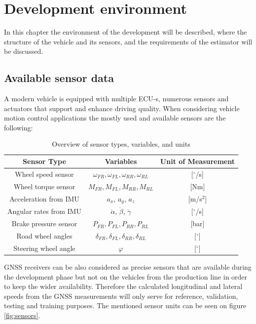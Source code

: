 \chapter{Development environment}

In this chapter the environment of the development will be described, where the structure of the vehicle and its sensors, and the requirements of the estimator will be discussed.

\section{Available sensor data}

A modern vehicle is equipped with multiple ECU-s, numerous sensors and actuators that support and enhance driving quality. When considering vehicle motion control applications the mostly used and available sensors are the following:
\begin{table}[ht]
\centering
\begin{tabular}{|c|c|c|}
\hline
\textbf{Sensor Type} & \textbf{Variables} & \textbf{Unit of Measurement} \\
\hline
Wheel speed sensor & $\omega_{FR}, \omega_{FL}, \omega_{RR}, \omega_{RL}$ & [$^\circ$/s] \\
\hline
Wheel torque sensor & $M_{FR}, M_{FL}, M_{RR}, M_{RL}$ & [Nm] \\
\hline
Acceleration from IMU & $a_x$, $a_y$, $a_z$ & [m/s$^2$] \\
\hline
Angular rates from IMU & $\dot{\alpha}$, $\dot{\beta}$, $\dot{\gamma}$ & [$^\circ$/s] \\
\hline
Brake pressure sensor & $P_{FR}, P_{FL}, P_{RR}, P_{RL}$ & [bar] \\
\hline
Road wheel angles & $\delta_{FR}, \delta_{FL}, \delta_{RR}, \delta_{RL}$ & [$^\circ$] \\
\hline
Steering wheel angle & $\varphi$ & [$^\circ$] \\
\hline
\end{tabular}
\caption{Overview of sensor types, variables, and units}
\label{tab:sensor_table}
\end{table}


GNSS receivers can be also considered as precise sensors that are available during the development phase but not on the vehicles from the production line in order to keep the wider availability. Therefore the calculated longitudinal and lateral speeds from the GNSS measurements will only serve for reference, validation, testing and training purposes. The mentioned sensor units can be seen on figure \ref{fig:sensors}. 

